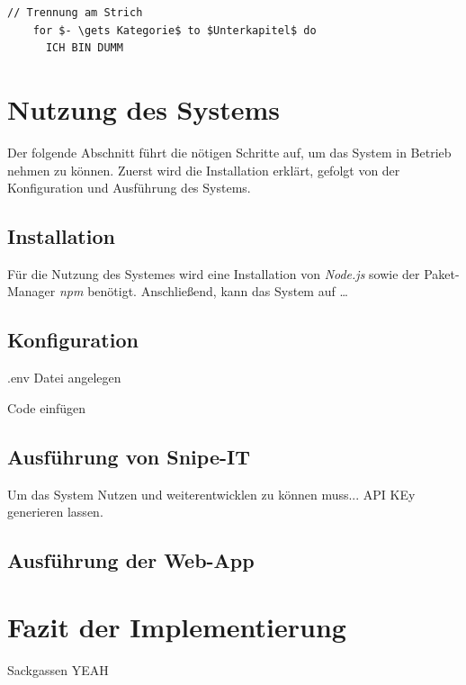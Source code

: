 \begin{lstlisting}[style=pseudo,gobble=2,caption={Pseudocode: Kategorien anzeigen},label=fig:categoriecode]
  // Trennung am Strich
    for $- \gets Kategorie$ to $Unterkapitel$ do
      ICH BIN DUMM
\end{lstlisting}


\section{Nutzung des Systems}
Der folgende Abschnitt führt die nötigen Schritte auf, um das System in Betrieb
nehmen zu können. Zuerst wird die Installation erklärt, gefolgt von der Konfiguration und Ausführung
des Systems. 

\subsection{Installation}
Für die Nutzung des Systemes wird eine Installation von \textit{Node.js} sowie der Paket-Manager
\textit{npm} benötigt. Anschließend, kann das System auf \dots

\subsection{Konfiguration}
.env Datei angelegen

Code einfügen

\subsection{Ausführung von Snipe-IT}
Um das System Nutzen und weiterentwicklen zu können muss... API KEy generieren
lassen.

\subsection{Ausführung der Web-App}


\section{Fazit der Implementierung}

Sackgassen YEAH
